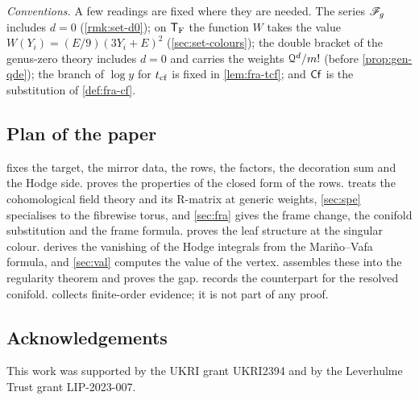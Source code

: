 \emph{Conventions.} A few readings are fixed where they are needed. The series $\mathscr{F}_g$ includes $d=0$ (\cref{rmk:set-d0}); on $\mathsf{T}_{\mathrm{F}}$ the function $W$ takes the value $W(Y_i)=(E/9)(3Y_i+E)^2$ (\cref{sec:set-colours}); the double bracket of the genus-zero theory includes $d=0$ and carries the weights $\mathcal{Q}^d/m!$ (before \cref{prop:gen-qde}); the branch of $\log y$ for $t_{\mathrm{cf}}$ is fixed in \cref{lem:fra-tcf}; and $\mathsf{Cf}$ is the substitution of \cref{def:fra-cf}.

\subsection{Plan of the paper}
\label{sec:int-plan}

 fixes the target, the mirror data, the rows, the factors, the decoration sum and the Hodge side.  proves the properties of the closed form of the rows.  treats the cohomological field theory and its R-matrix at generic weights, \cref{sec:spe} specialises to the fibrewise torus, and \cref{sec:fra} gives the frame change, the conifold substitution and the frame formula.  proves the leaf structure at the singular colour.  derives the vanishing of the Hodge integrals from the Mari\~no--Vafa formula, and \cref{sec:val} computes the value of the vertex.  assembles these into the regularity theorem and proves the gap.  records the counterpart for the resolved conifold.  collects finite-order evidence; it is not part of any proof.


\subsection*{Acknowledgements}

This work was supported by the UKRI grant UKRI2394 and by the Leverhulme Trust grant LIP-2023-007.
